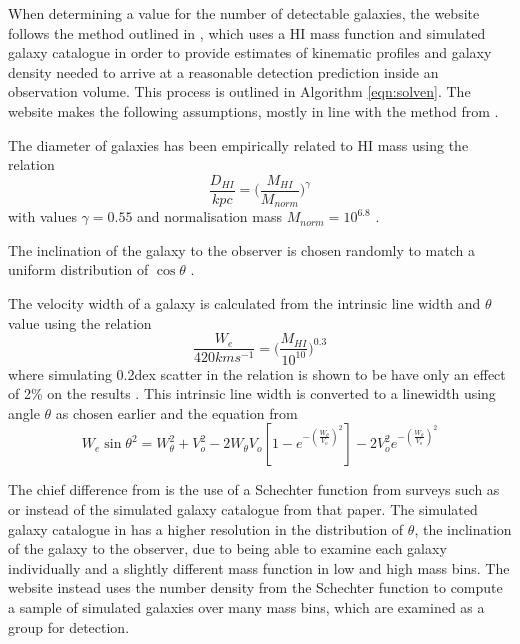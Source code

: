 \documentclass[11pt]{article}
\begin{document}
When determining a value for the number of detectable galaxies, the website follows the method outlined in \textcite{duffy}, which uses a HI mass function and simulated galaxy catalogue in order to provide estimates of kinematic profiles and galaxy density needed to arrive at a reasonable detection prediction inside an observation volume. This process is outlined in Algorithm \ref{eqn:solven}. The website makes the following assumptions, mostly in line with the method from \textcite[p. 8]{duffy}.

The diameter of galaxies has been empirically related to HI mass using the relation $$\frac{D_{HI}}{kpc}=\bigg(\frac{M_{HI}}{M_{norm}}\bigg)^\gamma$$ with values $\gamma = 0.55$ and normalisation mass $M_{norm}=10^{6.8}$ \parencite[p. 9]{duffy}.

The inclination of the galaxy to the observer is chosen randomly to match a uniform distribution of $\cos \theta$ \parencite[p. 8]{duffy}.

The velocity width of a galaxy is calculated from the intrinsic line width and $\theta$ value using the relation $$\frac{W_e}{420kms^{-1}}=\bigg(\frac{M_{HI}}{10^{10}}\bigg)^{0.3}$$ where simulating 0.2dex scatter in the relation is shown to be have only an effect of 2\% on the results \parencite[p. 9]{duffy}. This intrinsic line width is converted to a linewidth using angle $\theta$ as chosen earlier and the equation from \textcite{tullyfouque} $$W_e \sin \theta^2 = W_\theta^2 + V_o^2 - 2W_\theta V_o [1-e^{-(\frac{W_\theta}{V_o})^2}] - 2V_o^2e^{-(\frac{W_\theta}{V_o})^2}$$

The chief difference from \textcite{duffy} is the use of a Schechter function \parencite{schechter} from surveys such as \textcite{alfalfa} or \textcite{hipass2003} instead of the simulated galaxy catalogue from that paper. The simulated galaxy catalogue in \textcite{duffy} has a higher resolution in the distribution of $\theta$, the inclination of the galaxy to the observer, due to being able to examine each galaxy individually and a slightly different mass function in low and high mass bins. The website instead uses the number density from the Schechter function to compute a sample of simulated galaxies over many mass bins, which are examined as a group for detection.
\end{document}
